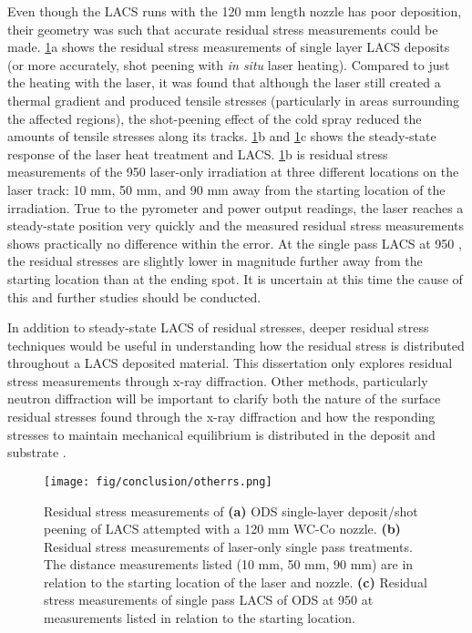		Even though the LACS runs with the 120 mm length nozzle has poor deposition, their geometry was such that accurate residual stress measurements could be made. \ref{fig:otherrs}a shows the residual stress measurements of single layer LACS deposits (or more accurately, shot peening with \textit{in situ} laser heating). Compared to just the heating with the laser, it was found that although the laser still created a thermal gradient and produced tensile stresses (particularly in areas surrounding the affected regions), the shot-peening effect of the cold spray reduced the amounts of tensile stresses along its tracks. \ref{fig:otherrs}b and \ref{fig:otherrs}c shows the steady-state response of the laser heat treatment and LACS. \ref{fig:otherrs}b is residual stress measurements of the 950 \celsius{} laser-only irradiation at three different locations on the laser track: 10 mm, 50 mm, and 90 mm away from the starting location of the irradiation. True to the pyrometer and power output readings, the laser reaches a steady-state position very quickly and the measured residual stress measurements shows practically no difference within the error. At the single pass LACS at 950 \celsius{}, the residual stresses are slightly lower in magnitude further away from the starting location than at the ending spot. It is uncertain at this time the cause of this and further studies should be conducted.
	
		In addition to steady-state LACS of residual stresses, deeper residual stress techniques would be useful in understanding how the residual stress is distributed throughout a LACS deposited material. This dissertation only explores residual stress measurements through x-ray diffraction. Other methods, particularly neutron diffraction will be important to clarify both the nature of the surface residual stresses found through the x-ray diffraction and how the responding stresses to maintain mechanical equilibrium is distributed in the deposit and substrate \cite{RN1400}. 
		
		\begin{figure}
			\centering
			\texttt{[image: fig/conclusion/otherrs.png]}
			\caption[Residual stress measurements of ODS single-layer deposit/shot peening of LACS attempted with a 120 mm WC-Co nozzle.]{Residual stress measurements of \textbf{(a)}\textit{ }ODS single-layer deposit/shot peening of LACS attempted with a 120 mm WC-Co nozzle. \textbf{(b) }Residual stress measurements of laser-only single pass treatments. The distance measurements listed (10 mm, 50 mm, 90 mm) are in relation to the starting location of the laser and nozzle. \textbf{(c) }Residual stress measurements of single pass LACS of ODS at 950 \celsius{} at measurements listed in relation to the starting location.}
			\label{fig:otherrs}
		\end{figure}
		
